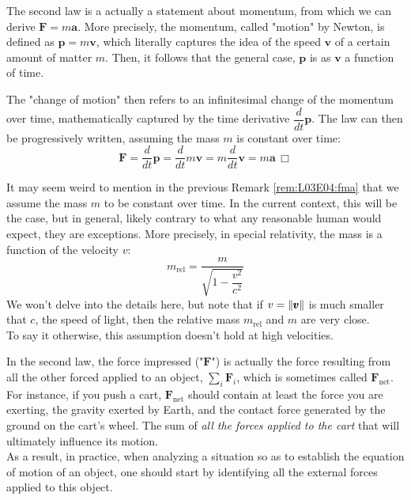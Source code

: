 \documentclass[solutions.tex]{subfiles}
\renewcommand{\bm}[1]{\pmb{#1}}
\renewcommand{\qed}{\,\Box}
\begin{document}
\begin{remark}\label{rem:L03E04:fma} The second law is a actually a statement
about momentum, from which we can derive $\bm{F}=m\bm{a}$.
More precisely, the momentum, called "motion" by Newton,
is defined as $\bm{p} = m\bm{v}$, which literally captures the idea of
the speed $\bm{v}$ of a certain amount of matter $m$. Then, it follows
that the general case, $\bm{p}$ is as $\bm{v}$ a function of time.

The "change of motion" then refers to an infinitesimal change of
the momentum over time, mathematically captured by the time derivative
$\dfrac{d}{dt}\bm{p}$. The law can then
be progressively written, assuming the mass $m$ is constant over time:
\[
	\bm{F} = \frac{d}{dt}\bm{p}
	= \frac{d}{dt}m\bm{v}
	= m\frac{d}{dt}\bm{v}
	= m\bm{a}\qed
\]
\end{remark}

\begin{remark}\label{rem:L03E04:relmass} It may seem weird to mention
in the previous Remark \ref{rem:L03E04:fma} that we assume the mass $m$
to be constant over time. In the current context, this will be the case,
but in general, likely contrary to what any reasonable human would expect,
they are exceptions. More precisely,
in special relativity, the mass is a function of the velocity $v$:
\[
	m_{\text{rel}} = \frac{m}{\sqrt{1-\dfrac{v^2}{c^2}}}
\]
We won't delve into the details here, but note that if $v=\norm{\bm{v}}$
is much smaller that $c$, the speed of light, then the relative
mass $m_{\text{rel}}$ and $m$ are very close.\\

To say it otherwise, this assumption doesn't hold at high velocities.
\end{remark}

\begin{remark} In the second law, the force impressed ("$\bm{F}$") is
actually the force resulting from all the other forced applied to an
object, $\sum_i\bm{F}_i$, which is sometimes called $\bm{F}_\text{net}$. \\

For instance, if you push a cart, $\bm{F}_\text{net}$ should contain
at least the force you are exerting, the gravity exerted by Earth, and
the contact force generated by the ground on the cart's wheel.
The sum of \textit{all the forces applied to the cart} that will
ultimately influence its motion. \\

As a result, in practice, when analyzing a situation so as to establish
the equation of motion of an object, one should start by identifying
all the external forces applied to this object.
\end{remark}
\end{document}
